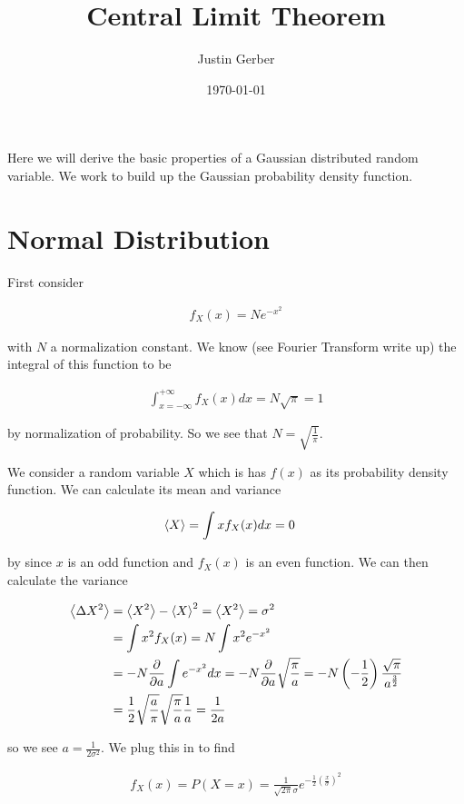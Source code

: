 \documentclass[12pt]{article}
\begin{document}
\title{Central Limit Theorem}
\author{Justin Gerber}
\date{\today}
\maketitle

Here we will derive the basic properties of a Gaussian distributed random variable. We work to build up the Gaussian probability density function.

\section{Normal Distribution}
First consider

\begin{align}
f_X(x) = N e^{-x^2}
\end{align}

with $N$ a normalization constant. We know (see Fourier Transform write up) the integral of this function to be

\begin{align}
\int_{x=-\infty}^{+\infty} f_X(x) dx = N \sqrt{\pi} = 1
\end{align}

by normalization of probability. So we see that $N = \sqrt{\frac{1}{\pi}}$.

We consider a random variable $X$ which is has $f(x)$ as its probability density function. We can calculate its mean and variance

\begin{align}
\Braket{X} &= \int xf_X(x) dx=0
\end{align}

by since $x$ is an odd function and $f_X(x)$ is an even function. We can then calculate the variance

\begin{align}
\Braket{\Delta X^2} &= \Braket{X^2} - \Braket{X}^2 = \Braket{X^2} = \sigma^2\\
&= \int x^2 f_X(x) = N\int x^2 e^{-x^2}\\
&= -N \frac{\partial}{\partial a} \int e^{-x^2} dx = -N \frac{\partial}{\partial a} \sqrt{\frac{\pi}{a}} = -N \left(-\frac{1}{2}\right) \frac{\sqrt{\pi}}{a^{\frac{3}{2}}}\\
&= \frac{1}{2} \sqrt{\frac{a}{\pi}} \sqrt{\frac{\pi}{a}} \frac{1}{a} = \frac{1}{2a}
\end{align}

so we see $a = \frac{1}{2\sigma^2}$. We plug this in to find

\begin{align}
f_X(x) = P(X=x) = \frac{1}{\sqrt{2 \pi} \sigma} e^{-\frac{1}{2}\left(\frac{x}{\sigma}\right)^2}
\end{align}
\end{document}
